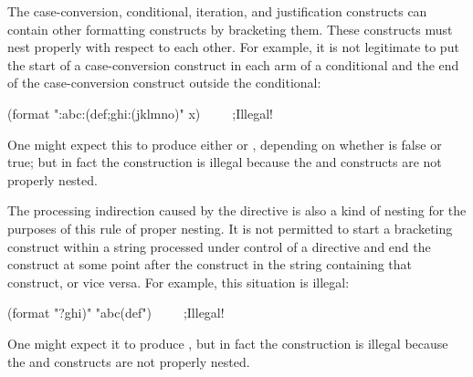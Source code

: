 The case-conversion, conditional, iteration, and justification
constructs can contain other formatting constructs by bracketing them.
These constructs must nest properly with respect to each other.
For example, it is not legitimate to put the start of a case-conversion
construct in each arm of a conditional and the
end of the case-conversion construct outside the conditional:
\begin{lisp}
(format {\false} "{\Xtilde}:{\Xlbracket}abc{\Xtilde}:{\Xatsign}(def{\Xtilde};ghi{\Xtilde}:{\Xatsign}(jkl{\Xtilde}{\Xrbracket}mno{\Xtilde})" x)~~~~~;\textrm{Illegal!}
\end{lisp}
One might expect this to produce either  or ,
depending on whether  is false or true; but in fact the construction
is illegal because the 
and  constructs are not properly nested.

The processing indirection caused by the  directive
is also a kind of nesting for the purposes of this rule of proper nesting.
It is not permitted to
start a bracketing construct within a string processed
under control of a 
directive and end the construct at some point after the  construct
in the string containing that construct, or vice versa.
For example, this situation is illegal:
\begin{lisp}
(format {\false} "{\Xtilde}?ghi{\Xtilde})" "abc{\Xtilde}{\Xatsign}(def")~~~~~;\textrm{Illegal!}
\end{lisp}
One might expect it to produce , but in fact the construction
is illegal because the 
and  constructs are not properly nested.

